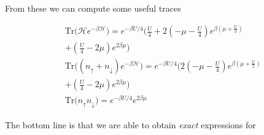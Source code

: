 \documentclass[10pt, twocolumn, twoside]{article}
\begin{document}
From these we can compute some useful traces

\begin{equation}
\begin{split}
&\text{Tr} \bigg( \mathcal{H} e^{-\beta\mathcal{H} } \bigg) = e^{-\beta U / 4} \bigg(\frac{U}{4} + 2 (-\mu - \frac{U}{4})  e^{\beta(\mu + \frac{U}{2})} \\
& + (\frac{U}{4} - 2\mu ) e^{2\beta \mu} \bigg) \\
&\text{Tr} \bigg( (n_\uparrow + n_\downarrow ) e^{-\beta\mathcal{H} } \bigg) = e^{-\beta U / 4} \bigg(2 (-\mu - \frac{U}{4})  e^{\beta(\mu + \frac{U}{2})} \\
& + (\frac{U}{4} - 2\mu ) e^{2\beta \mu} \bigg) \\
&\text{Tr} \bigg( n_\uparrow n_\downarrow \bigg) = e^{-\beta U/4} e^{2\beta\mu}
\end{split}
\end{equation}

The bottom line is that we are able to obtain \emph{exact} expressions for
\end{document}
